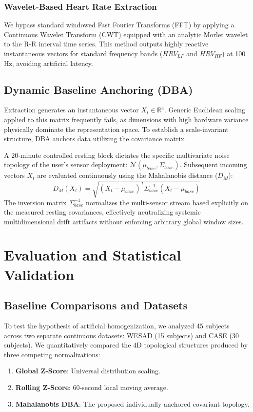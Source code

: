 \documentclass{IEEE_lsens}
\begin{document}
\subsubsection{Wavelet-Based Heart Rate Extraction}
We bypass standard windowed Fast Fourier Transforms (FFT) by applying a Continuous Wavelet Transform (CWT) equipped with an analytic Morlet wavelet to the R-R interval time series. This method outputs highly reactive instantaneous vectors for standard frequency bands ($HRV_{LF}$ and $HRV_{HF}$) at 100 Hz, avoiding artificial latency.

\subsection{Dynamic Baseline Anchoring (DBA)}
Extraction generates an instantaneous vector $X_t \in \mathbb{R}^4$. Generic Euclidean scaling applied to this matrix frequently fails, as dimensions with high hardware variance physically dominate the representation space. To establish a scale-invariant structure, DBA anchors data utilizing the covariance matrix.

A 20-minute controlled resting block dictates the specific multivariate noise topology of the user's sensor deployment: $\mathcal{N}(\mu_{base}, \Sigma_{base})$. Subsequent incoming vectors $X_t$ are evaluated continuously using the Mahalanobis distance ($D_M$):
\begin{equation}
    D_M(X_t) = \sqrt{(X_t - \mu_{base})^T \Sigma_{base}^{-1} (X_t - \mu_{base})}
\end{equation}
The inversion matrix $\Sigma_{base}^{-1}$ normalizes the multi-sensor stream based explicitly on the measured resting covariances, effectively neutralizing systemic multidimensional drift artifacts without enforcing arbitrary global window sizes.

\section{Evaluation and Statistical Validation}

\subsection{Baseline Comparisons and Datasets}
To test the hypothesis of artificial homogenization, we analyzed 45 subjects across two separate continuous datasets: WESAD (15 subjects) \cite{schmidt2018wesad} and CASE (30 subjects). We quantitatively compared the 4D topological structures produced by three competing normalizations:
\begin{enumerate}
    \item \textbf{Global Z-Score}: Universal distribution scaling.
    \item \textbf{Rolling Z-Score}: 60-second local moving average.
    \item \textbf{Mahalanobis DBA}: The proposed individually anchored covariant topology.
\end{enumerate}
\end{document}
